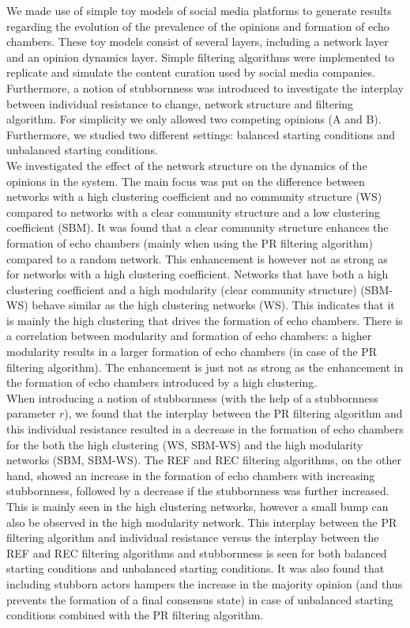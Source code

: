 \documentclass[11 pt , letterpaper , twoside , openright]{book}
\begin{document}
We made use of simple toy models of social media platforms to generate results regarding the evolution of the prevalence of the opinions and formation of echo chambers. These toy models consist of several layers, including a network layer and an opinion dynamics layer. Simple filtering algorithms were implemented to replicate and simulate the content curation used by social media companies. Furthermore, a notion of stubbornness was introduced to investigate the interplay between individual resistance to change, network structure and filtering algorithm. For simplicity we only allowed two competing opinions (A and B). Furthermore, we studied two different settings: balanced starting conditions and unbalanced starting conditions.\\
\newline
We investigated the effect of the network structure on the dynamics of the opinions in the system. The main focus was put on the difference between networks with a high clustering coefficient and no community structure (WS) compared to networks with a clear community structure and a low clustering coefficient (SBM). It was found that a clear community structure enhances the formation of echo chambers (mainly when using the PR filtering algorithm) compared to a random network. This enhancement is however not as strong as for networks with a high clustering coefficient. Networks that have both a high clustering coefficient and a high modularity (clear community structure) (SBM-WS) behave similar as the high clustering networks (WS). This indicates that it is mainly the high clustering that drives the formation of echo chambers. There is a correlation between modularity and formation of echo chambers: a higher modularity results in a larger formation of echo chambers (in case of the PR filtering algorithm). The enhancement is just not as strong as the enhancement in the formation of echo chambers introduced by a high clustering. \\
\newline
When introducing a notion of stubbornness (with the help of a stubbornness parameter $r$), we found that the interplay between the PR filtering algorithm and this individual resistance resulted in a decrease in the formation of echo chambers for the both the high clustering (WS, SBM-WS) and the high modularity networks (SBM, SBM-WS). The REF and REC filtering algorithms, on the other hand, showed an increase in the formation of echo chambers with increasing stubbornness, followed by a decrease if the stubbornness was further increased. This is mainly seen in the high clustering networks, however a small bump can also be observed in the high modularity network. This interplay between the PR filtering algorithm and individual resistance versus the interplay between the REF and REC filtering algorithms and stubbornness is seen for both balanced starting conditions and unbalanced starting conditions. It was also found that including stubborn actors hampers the increase in the majority opinion (and thus prevents the formation of a final consensus state) in case of unbalanced starting conditions combined with the PR filtering algorithm.\\
\end{document}
